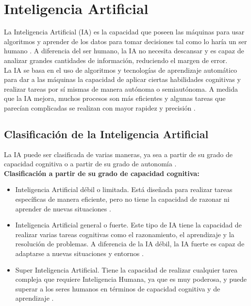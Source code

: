 \section{Inteligencia Artificial}
La Inteligencia Artificial (IA) es la capacidad que poseen las máquinas para usar algoritmos y aprender de los datos para tomar decisiones tal como lo haría un ser humano \cite{ref41}. A diferencia del ser humano, la IA no necesita descansar y es capaz de analizar grandes cantidades de información, reduciendo el margen de error.\\

La IA se basa en el uso de algoritmos y tecnologías de aprendizaje automático para dar a las máquinas la capacidad de aplicar ciertas habilidades cognitivas y realizar tareas por sí mismas de manera autónoma o semiautónoma. A medida que la IA mejora, muchos procesos son más eficientes y algunas tareas que parecían complicadas se realizan con mayor rapidez y precisión \cite{ref42}.\\

\newpage
\subsection{Clasificación de la Inteligencia Artificial}
La IA puede ser clasificada de varias maneras, ya sea a partir de su grado de capacidad cognitiva o a partir de su grado de autonomía \cite{ref42}.\\

\textbf{Clasificación a partir de su grado de capacidad cognitiva:}
\begin{itemize}
    \item Inteligencia Artificial débil o limitada. Está diseñada para realizar tareas específicas de manera eficiente, pero no tiene la capacidad de razonar ni aprender de nuevas situaciones \cite{ref42}.\\
\item Inteligencia Artificial general o fuerte. Este tipo de IA tiene la capacidad de realizar varias tareas cognitivas como el razonamiento, el aprendizaje y la resolución de problemas. A diferencia de la IA débil, la IA fuerte es capaz de adaptarse a nuevas situaciones y entornos \cite{ref42}.\\
\item Super Inteligencia Artificial. Tiene la capacidad de realizar cualquier tarea compleja que requiere Inteligencia Humana, ya que es muy poderosa, y puede superar a los seres humanos en términos de capacidad cognitiva y de aprendizaje \cite{ref42}.\\

\end{itemize}

